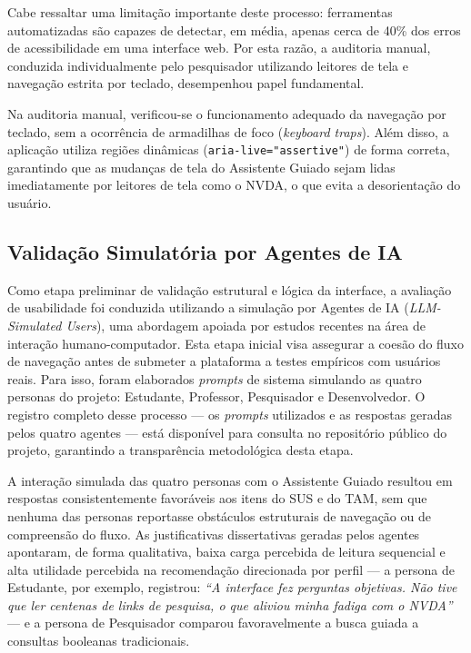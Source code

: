 \documentclass[12pt]{article}
\begin{document}
Cabe ressaltar uma limitação importante deste processo: ferramentas automatizadas são capazes de detectar, em média, apenas cerca de 40\% dos erros de acessibilidade em uma interface web. Por esta razão, a auditoria manual, conduzida individualmente pelo pesquisador utilizando leitores de tela e navegação estrita por teclado, desempenhou papel fundamental.

Na auditoria manual, verificou-se o funcionamento adequado da navegação por teclado, sem a ocorrência de armadilhas de foco (\textit{keyboard traps}). Além disso, a aplicação utiliza regiões dinâmicas (\texttt{aria-live="assertive"}) de forma correta, garantindo que as mudanças de tela do Assistente Guiado sejam lidas imediatamente por leitores de tela como o NVDA, o que evita a desorientação do usuário.

\subsection{Validação Simulatória por Agentes de IA}
Como etapa preliminar de validação estrutural e lógica da interface, a avaliação de usabilidade foi conduzida utilizando a simulação por Agentes de IA (\textit{LLM-Simulated Users}), uma abordagem apoiada por estudos recentes na área de interação humano-computador. Esta etapa inicial visa assegurar a coesão do fluxo de navegação antes de submeter a plataforma a testes empíricos com usuários reais. Para isso, foram elaborados \textit{prompts} de sistema simulando as quatro personas do projeto: Estudante, Professor, Pesquisador e Desenvolvedor. O registro completo desse processo --- os \textit{prompts} utilizados e as respostas geradas pelos quatro agentes --- está disponível para consulta no repositório público do projeto, garantindo a transparência metodológica desta etapa.

A interação simulada das quatro personas com o Assistente Guiado resultou em respostas consistentemente favoráveis aos itens do SUS e do TAM, sem que nenhuma das personas reportasse obstáculos estruturais de navegação ou de compreensão do fluxo. As justificativas dissertativas geradas pelos agentes apontaram, de forma qualitativa, baixa carga percebida de leitura sequencial e alta utilidade percebida na recomendação direcionada por perfil --- a persona de Estudante, por exemplo, registrou: \textit{``A interface fez perguntas objetivas. Não tive que ler centenas de links de pesquisa, o que aliviou minha fadiga com o NVDA''} --- e a persona de Pesquisador comparou favoravelmente a busca guiada a consultas booleanas tradicionais.
\end{document}
